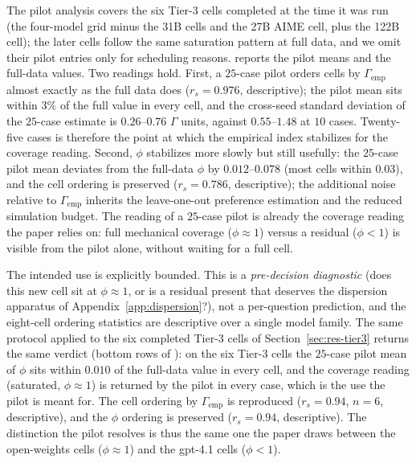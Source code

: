 \documentclass{article}
\newcommand{\agreementIndex}{\Gamma}
\begin{document}
The pilot analysis covers the six Tier-3 cells completed at the time it was run (the four-model grid minus the 31B cells and the 27B AIME cell, plus the 122B cell); the later cells follow the same saturation pattern at full data, and we omit their pilot entries only for scheduling reasons.  reports the pilot means and the full-data values. Two
readings hold. First, a $25$-case pilot orders cells by
$\agreementIndex_{\mathrm{emp}}$ almost exactly as the full data does
($r_s=0.976$, descriptive); the pilot mean sits within $3\%$ of the full
value in every cell, and the cross-seed standard deviation of the
$25$-case estimate is $0.26$--$0.76$ $\agreementIndex$ units, against
$0.55$--$1.48$ at $10$ cases. Twenty-five cases is therefore the point
at which the empirical index stabilizes for the coverage reading. Second, $\phi$
stabilizes more slowly but still usefully: the $25$-case pilot mean
deviates from the full-data $\phi$ by $0.012$--$0.078$ (most cells
within $0.03$), and the cell ordering is preserved ($r_s=0.786$,
descriptive); the additional noise relative to $\agreementIndex_{\mathrm{emp}}$
inherits the leave-one-out preference estimation and the reduced
simulation budget. The reading of a $25$-case pilot is already the
coverage reading the paper relies on: full mechanical coverage
($\phi\approx1$) versus a residual ($\phi<1$) is visible from the
pilot alone, without waiting for a full cell.

The intended use is explicitly bounded. This is a
\emph{pre-decision diagnostic} (does this new cell sit at
$\phi\approx1$, or is a residual present that deserves the dispersion
apparatus of Appendix~\ref{app:dispersion}?), not a per-question
prediction, and the eight-cell ordering statistics are descriptive over
a single model family. The same protocol applied to the six completed
Tier-3 cells of Section~\ref{sec:res-tier3} returns the same verdict
(bottom rows of ): on the six Tier-3 cells the
$25$-case pilot mean of $\phi$
sits within $0.010$ of the full-data value in every cell, and the
coverage reading (saturated, $\phi\approx1$) is returned by the
pilot in every case, which is the use the pilot is meant for.
The cell ordering by $\agreementIndex_{\mathrm{emp}}$ is reproduced
($r_s=0.94$, $n=6$, descriptive), and the $\phi$ ordering is
preserved ($r_s=0.94$, descriptive). The distinction the pilot resolves
is thus the same one the paper draws between the open-weights cells
($\phi\approx1$) and the gpt-4.1 cells ($\phi<1$).
\end{document}
